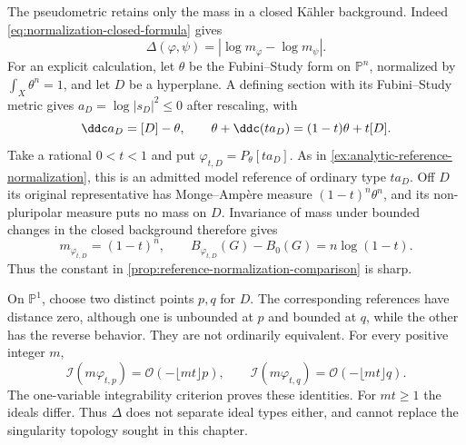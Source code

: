 \begin{example}\label{ex:normalization-distance-projective}
The pseudometric retains only the mass in a closed K\"ahler background. Indeed \eqref{eq:normalization-closed-formula} gives
\[
 \Delta(\varphi,\psi)=|\log m_\varphi-\log m_\psi|.
\]
For an explicit calculation, let $\theta$ be the Fubini--Study form on $\mathbb P^n$, normalized by $\int_X\theta^n=1$, and let $D$ be a hyperplane. A defining section with its Fubini--Study metric gives $a_D=\log|s_D|^2\leq0$ after rescaling, with
\[
 \ddc a_D=[D]-\theta,\qquad
 \theta+\ddc(ta_D)=(1-t)\theta+t[D].
\]
Take a rational $0<t<1$ and put $\varphi_{t,D}=P_\theta[ta_D]$. As in \cref{ex:analytic-reference-normalization}, this is an admitted model reference of ordinary type $ta_D$. Off $D$ its original representative has Monge--Amp\`ere measure $(1-t)^n\theta^n$, and its non-pluripolar measure puts no mass on $D$. Invariance of mass under bounded changes in the closed background therefore gives
\[
 m_{\varphi_{t,D}}=(1-t)^n,\qquad
 B_{\varphi_{t,D}}(G)-B_0(G)=n\log(1-t).
\]
Thus the constant in \cref{prop:reference-normalization-comparison} is sharp.

On $\mathbb P^1$, choose two distinct points $p,q$ for $D$. The corresponding references have distance zero, although one is unbounded at $p$ and bounded at $q$, while the other has the reverse behavior. They are not ordinarily equivalent. For every positive integer $m$,
\[
 \mathcal I(m\varphi_{t,p})=\mathcal O(-\lfloor mt\rfloor p),\qquad
 \mathcal I(m\varphi_{t,q})=\mathcal O(-\lfloor mt\rfloor q).
\]
The one-variable integrability criterion proves these identities. For $mt\geq1$ the ideals differ. Thus $\Delta$ does not separate ideal types either, and cannot replace the singularity topology sought in this chapter.
\end{example}
